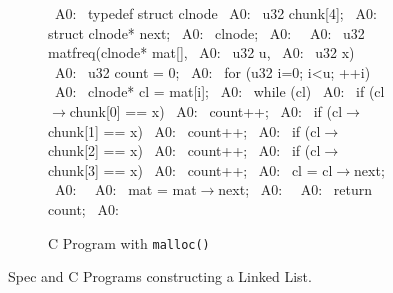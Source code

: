 \begin{figure}[H]
\begin{minipage}[c]{0.50\textwidth}
\begin{subfigure}[t]{\textwidth}
\begin{center}
\begin{allLangEnvScript}
~{\tiny \textcolor{mygray}{A0:}}~ typedef struct clnode {
~{\tiny \textcolor{mygray}{A0:}}~   u32 chunk[4];
~{\tiny \textcolor{mygray}{A0:}}~   struct clnode* next;
~{\tiny \textcolor{mygray}{A0:}}~ } clnode;
~{\tiny \textcolor{mygray}{A0:}}~ 
~{\tiny \textcolor{mygray}{A0:}}~ u32 matfreq(clnode* mat[],
~{\tiny \textcolor{mygray}{A0:}}~             u32 u,
~{\tiny \textcolor{mygray}{A0:}}~             u32 x) {
~{\tiny \textcolor{mygray}{A0:}}~   u32 count = 0;
~{\tiny \textcolor{mygray}{A0:}}~   for (u32 i=0; i<u; ++i) {
~{\tiny \textcolor{mygray}{A0:}}~     clnode* cl = mat[i];
~{\tiny \textcolor{mygray}{A0:}}~     while (cl) {
~{\tiny \textcolor{mygray}{A0:}}~       if (cl$\rightarrow$chunk[0] == x)
~{\tiny \textcolor{mygray}{A0:}}~         count++;
~{\tiny \textcolor{mygray}{A0:}}~       if (cl$\rightarrow$chunk[1] == x)
~{\tiny \textcolor{mygray}{A0:}}~         count++;
~{\tiny \textcolor{mygray}{A0:}}~       if (cl$\rightarrow$chunk[2] == x)
~{\tiny \textcolor{mygray}{A0:}}~         count++;
~{\tiny \textcolor{mygray}{A0:}}~       if (cl$\rightarrow$chunk[3] == x)
~{\tiny \textcolor{mygray}{A0:}}~         count++;
~{\tiny \textcolor{mygray}{A0:}}~       cl = cl$\rightarrow$next;
~{\tiny \textcolor{mygray}{A0:}}~     }
~{\tiny \textcolor{mygray}{A0:}}~     mat = mat$\rightarrow$next;
~{\tiny \textcolor{mygray}{A0:}}~   }
~{\tiny \textcolor{mygray}{A0:}}~   return count;
~{\tiny \textcolor{mygray}{A0:}}~ }








\end{allLangEnvScript}
\end{center}
\vspace{-15px}
\caption{\label{fig:xx}C Program with {\tt malloc()}}
\end{subfigure}%
\end{minipage}%
\caption{\label{fig:xxx}Spec and C Programs constructing a Linked List.}
\end{figure}
